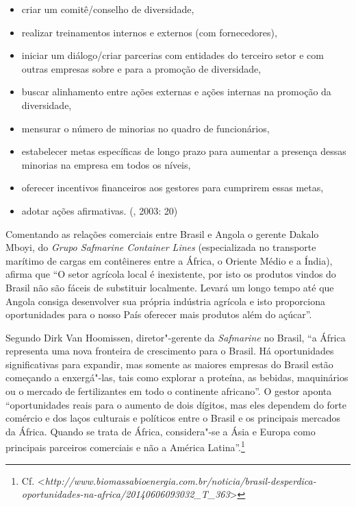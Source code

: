 \begin{itemize}
\item criar um comitê/conselho de diversidade,

\item realizar treinamentos internos e externos (com fornecedores),

\item iniciar um diálogo/criar parcerias com entidades do terceiro setor e
com outras empresas sobre e para a promoção de diversidade,

\item buscar alinhamento entre ações externas e ações internas na promoção
da diversidade,

\item mensurar o número de minorias no quadro de funcionários,

\item estabelecer metas específicas de longo prazo para aumentar a presença
dessas minorias na empresa em todos os níveis,

\item oferecer incentivos financeiros aos gestores para cumprirem essas
metas,

\item adotar ações afirmativas. (, 2003: 20)
\end{itemize}

Comentando as relações comerciais entre Brasil e Angola o gerente Dakalo
Mboyi, do \emph{Grupo Safmarine Container Lines} (especializada no
transporte marítimo de cargas em contêineres entre a África, o Oriente
Médio e a Índia), afirma que ``O setor agrícola local é inexistente, por
isto os produtos vindos do Brasil não são fáceis de substituir
localmente. Levará um longo tempo até que Angola consiga desenvolver sua
própria indústria agrícola e isto proporciona oportunidades para o nosso
País oferecer mais produtos além do açúcar''.

Segundo Dirk Van Hoomissen, diretor"-gerente da \emph{Safmarine} no
Brasil, ``a África representa uma nova fronteira de crescimento para o
Brasil. Há oportunidades significativas para expandir, mas somente as
maiores empresas do Brasil estão começando a enxergá"-las, tais como
explorar a proteína, as bebidas, maquinários ou o mercado de
fertilizantes em todo o continente africano''. O gestor aponta
``oportunidades reais para o aumento de dois dígitos, mas eles dependem
do forte comércio e dos laços culturais e políticos entre o Brasil e os
principais mercados da África. Quando se trata de África, considera"-se a
Ásia e Europa como principais parceiros comerciais e não a América
Latina''.\footnote{Cf.
  \textless{}\emph{http://www.biomassabioenergia.com.br/noticia/brasil-desperdica-oportunidades-na-africa/20140606093032\_T\_363}\textgreater{}}

